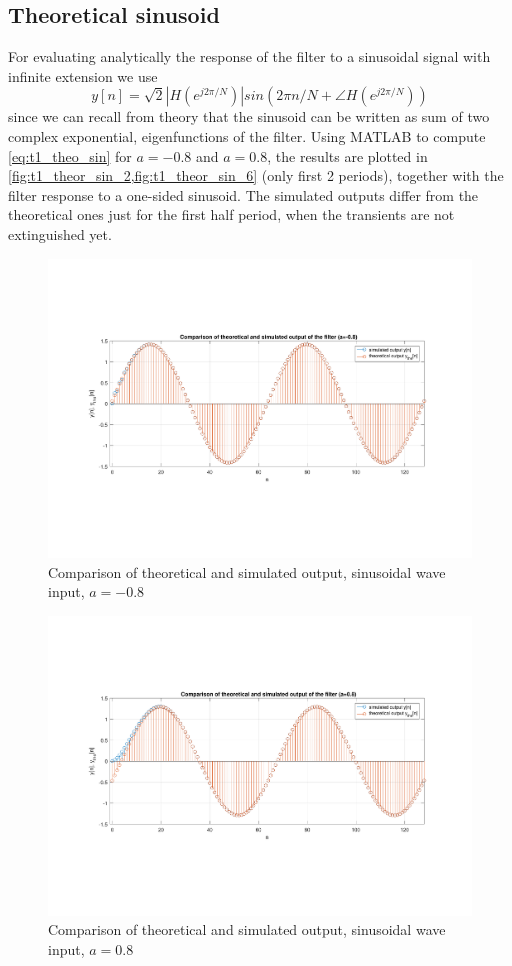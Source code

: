 \subsection{Theoretical sinusoid}
For evaluating analytically the response of the filter to a sinusoidal signal with infinite extension we use
\begin{equation}\label{eq:t1_theo_sin}
y[n]=\sqrt 2 |H(e^{j 2 \pi /N })|  sin(2\pi n/N + \angle H(e^{j 2 \pi /N }))
\end{equation}
since we can recall from theory that the sinusoid can be written as sum of two complex exponential, eigenfunctions of the filter.
Using MATLAB to compute \cref{eq:t1_theo_sin} for $a=-0.8$ and $a=0.8$, the results are plotted in \cref{fig:t1_theor_sin_2,fig:t1_theor_sin_6} (only first 2 periods), together with the filter response to a one-sided sinusoid. The simulated outputs differ from the theoretical ones just for the first half period, when the transients are not extinguished yet.
\begin{figure} [H]
	\centering
	\includegraphics[trim={2.5cm 5cm 2.5cm 5cm}, clip, width=0.65\linewidth]{theor_sin_2}
	\caption{Comparison of theoretical and simulated output, sinusoidal wave input, $a=-0.8$}
	\label{fig:t1_theor_sin_2}
\end{figure}


\begin{figure} [H]
	\centering
	\includegraphics[trim={2.5cm 5cm 2.5cm 5cm}, clip, width=0.65\linewidth]{theor_sin_6}
	\caption{Comparison of theoretical and simulated output, sinusoidal wave input, $a=0.8$}
	\label{fig:t1_theor_sin_6}
\end{figure}
